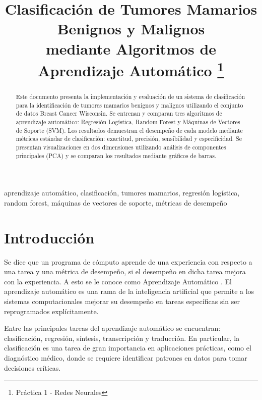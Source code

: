 \documentclass[conference]{IEEEtran}
\begin{document}
\title{Clasificación de Tumores Mamarios Benignos y Malignos\\
{\footnotesize mediante Algoritmos de Aprendizaje Automático}
\thanks{Práctica 1 - Redes Neurales}
}

\author{
}

\maketitle

\begin{abstract}
Este documento presenta la implementación y evaluación de un sistema de clasificación para la identificación de tumores mamarios benignos y malignos utilizando el conjunto de datos Breast Cancer Wisconsin. Se entrenan y comparan tres algoritmos de aprendizaje automático: Regresión Logística, Random Forest y Máquinas de Vectores de Soporte (SVM). Los resultados demuestran el desempeño de cada modelo mediante métricas estándar de clasificación: exactitud, precisión, sensibilidad y especificidad. Se presentan visualizaciones en dos dimensiones utilizando análisis de componentes principales (PCA) y se comparan los resultados mediante gráficos de barras.
\end{abstract}

\begin{IEEEkeywords}
aprendizaje automático, clasificación, tumores mamarios, regresión logística, random forest, máquinas de vectores de soporte, métricas de desempeño
\end{IEEEkeywords}

\section{Introducción}

Se dice que un programa de cómputo aprende de una experiencia con respecto a una tarea y una métrica de desempeño, si el desempeño en dicha tarea mejora con la experiencia. A esto se le conoce como Aprendizaje Automático \cite{b1}. El aprendizaje automático es una rama de la inteligencia artificial que permite a los sistemas computacionales mejorar su desempeño en tareas específicas sin ser reprogramados explícitamente.

Entre las principales tareas del aprendizaje automático se encuentran: clasificación, regresión, síntesis, transcripción y traducción. En particular, la clasificación es una tarea de gran importancia en aplicaciones prácticas, como el diagnóstico médico, donde se requiere identificar patrones en datos para tomar decisiones críticas.
\end{document}
